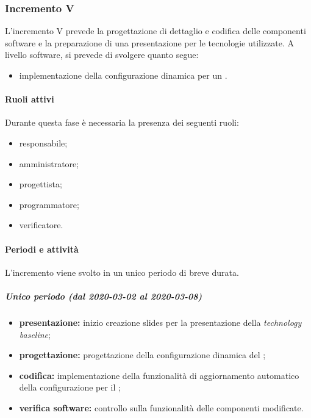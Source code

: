 		
		\subsubsection{Incremento V}
			
			L'incremento V prevede la progettazione di dettaglio e codifica delle componenti software e la preparazione di una presentazione per le tecnologie utilizzate. A livello software, si prevede di svolgere quanto segue:
			\begin{itemize}
				\item implementazione della configurazione dinamica per un .
			\end{itemize}
			
			\paragraph{Ruoli attivi}
			
				Durante questa fase è necessaria la presenza dei seguenti ruoli:
				\begin{itemize}
					\item responsabile;
					\item amministratore;
					\item progettista;
					\item programmatore;
					\item verificatore.
				\end{itemize}
			
			\paragraph{Periodi e attività}
			
				L'incremento viene svolto in un unico periodo di breve durata.
				
				\subparagraph{Unico periodo (dal 2020-03-02 al 2020-03-08)}
				
					\begin{itemize}
						\item \textbf{presentazione:} inizio creazione slides per la presentazione della \textit{technology baseline};
						\item \textbf{progettazione:} progettazione della configurazione dinamica del ;
						\item \textbf{codifica:} implementazione della funzionalità di aggiornamento automatico della configurazione per il ;
						\item \textbf{verifica software:} controllo sulla funzionalità delle componenti modificate.
					\end{itemize} 			


